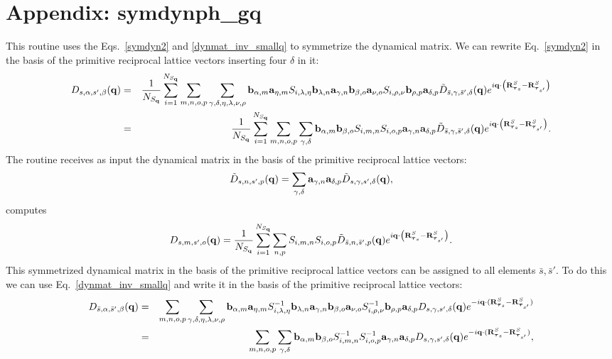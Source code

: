 \documentclass[12pt,a4paper,twoside]{report}
\begin{document}
\section{Appendix: symdynph\_gq}
This routine uses the Eqs.~\ref{symdyn2} and
\ref{dynmat_inv_smallq} to symmetrize the dynamical matrix. We can rewrite Eq.~\ref{symdyn2} in the basis of the primitive reciprocal lattice vectors inserting four
$\delta$ in it:
\begin{eqnarray}
D_{s,\alpha,s',\beta}({\bf q}) &=& {1\over N_{S_{\bf q}}}
\sum_{i=1}^{N_{S_{\bf q}}}
\sum_{m,n,o,p}
\sum_{\gamma,\delta,\eta,\lambda,\nu,\rho}
{\bf b}_{\alpha,m} {\bf a}_{\eta,m}
S_{i,\lambda,\eta} {\bf b}_{\lambda,n} {\bf a}_{\gamma,n}  {\bf b}_{\beta,o} {\bf a}_{\nu,o} S_{i,\rho,\nu} {\bf b}_{\rho,p} {\bf a}_{\delta,p}
\tilde D_{\bar s,\gamma,\bar s',\delta}({\bf q})
e^{i {\bf q} \cdot \left( {\bf R}^{S}_{\boldsymbol{\tau}_s} - {\bf R}^{S}_{\boldsymbol{\tau}_{s'}} \right) }
\nonumber\\
&=& {1\over N_{S_{\bf q}}}
\sum_{i=1}^{N_{S_{\bf q}}}
\sum_{m,n,o,p}
\sum_{\gamma, \delta}
{\bf b}_{\alpha,m} {\bf b}_{\beta,o}
S_{i,m,n} S_{i,o,p} {\bf a}_{\gamma,n} {\bf a}_{\delta,p}
\tilde D_{\bar s,\gamma,\bar s',\delta}({\bf q})
e^{i {\bf q} \cdot \left( {\bf R}^{S}_{\boldsymbol{\tau}_s} - {\bf R}^{S}_{\boldsymbol{\tau}_{s'}} \right)}.
\label{symdyn2_crys}
\end{eqnarray}
The routine receives as input the dynamical matrix in the basis of the primitive reciprocal lattice vectors: 
\begin{equation}
\tilde D_{s,n,s',p}({\bf q})
=\sum_{\gamma, \delta} {\bf a}_{\gamma,n} {\bf a}_{\delta,p}
\tilde D_{s,\gamma,s',\delta}({\bf q}),
\end{equation}
computes 
\begin{equation}
D_{s,m,s',o}({\bf q})
={1\over N_{S_{\bf q}}}
\sum_{i=1}^{N_{S_{\bf q}}}
\sum_{n,p}
S_{i,m,n} S_{i,o,p}
\tilde D_{\bar s,n,\bar s',p}({\bf q})
e^{i {\bf q} \cdot \left( {\bf R}^{S}_{\boldsymbol{\tau}_s} - {\bf R}^{S}_{\boldsymbol{\tau}_{s'}} \right)}. 
\end{equation}
This symmetrized dynamical matrix in the basis
of the primitive reciprocal lattice vectors 
can be assigned to all elements $\bar s, \bar s'$.
To do this we can use Eq.~\ref{dynmat_inv_smallq}
and write it in the basis of the primitive reciprocal lattice vectors:
\begin{eqnarray}
D_{\bar s,\alpha,\bar s',\beta}({\bf q}) &=&
\sum_{m,n,o,p} \sum_{\gamma,\delta,\eta,\lambda,\nu,\rho} {\bf b}_{\alpha,m} {\bf a}_{\eta,m} S^{-1}_{i,\lambda,\eta} {\bf b}_{\lambda,n} {\bf a}_{\gamma,n} {\bf b}_{\beta,o} {\bf a}_{\nu,o}  S^{-1}_{i,\rho,\nu} {\bf b}_{\rho,p} {\bf a}_{\delta,p}
D_{s,\gamma,s',\delta}({\bf q})
e^{-i {\bf q} \cdot ({\bf R}^{S}_{\boldsymbol{\tau}_s} - {\bf R}^{S}_{\boldsymbol{\tau}_{s'}})} \nonumber \\
&=& \sum_{m,n,o,p} \sum_{\gamma,\delta} {\bf b}_{\alpha,m} {\bf b}_{\beta,o}  S^{-1}_{i,m,n}    S^{-1}_{i,o,p} {\bf a}_{\gamma,n} {\bf a}_{\delta,p}
D_{s,\gamma,s',\delta}({\bf q})
e^{-i {\bf q} \cdot ({\bf R}^{S}_{\boldsymbol{\tau}_s} - {\bf R}^{S}_{\boldsymbol{\tau}_{s'}})}, 
\label{dynmat_inv_smallq_rec}
\end{eqnarray}
\end{document}
